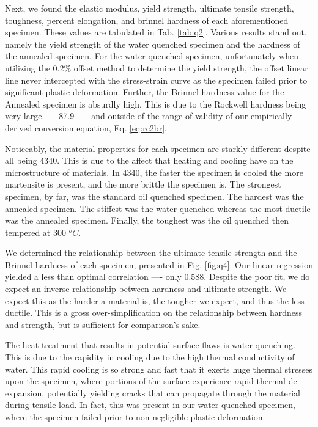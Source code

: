 \documentclass{article}
\begin{document}
Next, we found the elastic modulus, yield strength, ultimate tensile strength, toughness, percent elongation, and brinnel hardness of each aforementioned specimen. These values are tabulated in Tab. \ref{tab:q2}. Various results stand out, namely the yield strength of the water quenched specimen and the hardness of the annealed specimen. For the water quenched specimen, unfortunately when utilizing the 0.2\% offset method to determine the yield strength, the offset linear line never intercepted with the stress-strain curve as the specimen failed prior to significant plastic deformation. Further, the Brinnel hardness value for the Annealed specimen is absurdly high. This is due to the Rockwell hardness being very large ---- 87.9 ---- and outside of the range of validity of our empirically derived conversion equation, Eq. \ref{eq:rc2br}.

Noticeably, the material properties for each specimen are starkly different despite all being 4340. This is due to the affect that heating and cooling have on the microstructure of materials. In 4340, the faster the specimen is cooled the more martensite is present, and the more brittle the specimen is. The strongest specimen, by far, was the standard oil quenched specimen. The hardest was the annealed specimen. The stiffest was the water quenched whereas the most ductile was the annealed specimen. Finally, the toughest was the oil quenched then tempered at 300 $^oC$.

We determined the relationship between the ultimate tensile strength and the Brinnel hardness of each specimen, presented in Fig. \ref{fig:q4}. Our linear regression yielded a less than optimal correlation ---- only 0.588. Despite the poor fit, we do expect an inverse relationship between hardness and ultimate strength. We expect this as the harder a material is, the tougher we expect, and thus the less ductile. This is a gross over-simplification on the relationship between hardness and strength, but is sufficient for comparison's sake. 

The heat treatment that results in potential surface flaws is water quenching. This is due to the rapidity in cooling due to the high thermal conductivity of water. This rapid cooling is so strong and fast that it exerts huge thermal stresses upon the specimen, where portions of the surface experience rapid thermal de-expansion, potentially yielding cracks that can propagate through the material during tensile load. In fact, this was present in our water quenched specimen, where the specimen failed prior to non-negligible plastic deformation. 
\end{document}
